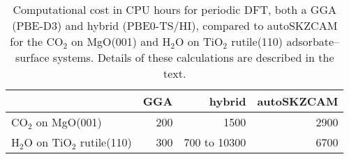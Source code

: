 \begin{table}[h]
\caption{\label{tab:computational_cost}Computational cost in CPU hours for periodic DFT, both a GGA (PBE-D3) and hybrid (PBE0-TS/HI), compared to autoSKZCAM for the CO$_2$ on MgO(001) and H$_2$O on TiO$_2$ rutile(110) adsorbate--surface systems. Details of these calculations are described in the text.}
\begin{tabular}{lrrr}
\toprule
 & GGA & hybrid & autoSKZCAM \\ 
\midrule
CO$_2$ on MgO(001) & 200 & 1500 & 2900 \\
H$_2$O on TiO$_2$ rutile(110) & 300 & 700 to 10300 & 6700 \\
\bottomrule
\end{tabular}
\end{table}